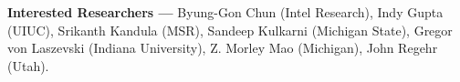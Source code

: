 \item \textbf{Interested Researchers ---} Byung-Gon Chun (Intel Research), Indy Gupta (UIUC), Srikanth Kandula (MSR), Sandeep Kulkarni (Michigan State), Gregor von Laszevski (Indiana University), Z. Morley Mao (Michigan), John Regehr (Utah).
